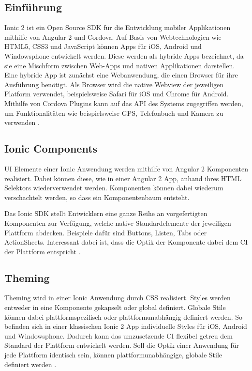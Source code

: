 \subsection{Einführung}

Ionic 2 ist ein Open Source \ac{SDK} für die Entwicklung mobiler Applikationen mithilfe von Angular 2 und Cordova.
Auf Basis von Webtechnologien wie HTML5, CSS3 und JavaScript können Apps für iOS, Android und Windowsphone
entwickelt werden. Diese werden als hybride Apps bezeichnet,
da sie eine Mischform zwischen Web-Apps und nativen Applikationen darstellen.
Eine hybride App ist zunächst eine Webanwendung, die einen Browser für ihre Ausführung benötigt.
Als Browser wird die native Webview der jeweiligen Platform verwendet,
beispielsweise Safari für iOS und Chrome für Android.
Mithilfe von Cordova Plugins kann auf das \ac{API} des Systems zugegriffen werden,
um Funktionalitäten wie beispielsweise GPS, Telefonbuch und Kamera zu verwenden \cite{ionic34:online}.

\subsection{Ionic Components}

\ac{UI} Elemente einer Ionic Anwendung werden mithilfe von Angular 2 Komponenten realisiert.
Dabei können diese, wie in einer Angular 2 App, anhand ihres HTML Selektors wiederverwendet werden.
Komponenten können dabei wiederum verschachtelt werden, so dass ein Komponentenbaum entsteht.

Das Ionic \ac{SDK} stellt Entwicklern eine ganze Reihe an vorgefertigten Komponenten zur Verfügung,
welche native Standardelemente der jeweiligen Plattform abdecken. Beispiele dafür sind Buttons, Listen, Tabs oder ActionSheets.
Interessant dabei ist, dass die Optik der Komponente dabei dem \ac{CI} der Plattform entspricht \cite{ionic99:online}.

\subsection{Theming}
Theming wird in einer Ionic Anwendung durch \ac{CSS} realisiert.
Styles werden entweder in eine Komponente gekapselt oder global definiert.
Globale Stile können dabei plattformspezifisch oder plattformunabhängig definiert werden.
So befinden sich in einer klassischen Ionic 2 App individuelle Styles für iOS, Android und Windowsphone.
Dadurch kann das umzusetzende \ac{CI} flexibel getreu dem Standard der Plattform entwickelt werden.
Soll die Optik einer Anwendung für jede Plattform identisch sein,
können plattformunabhängige, globale Stile definiert werden \cite{ionic73:online}.


